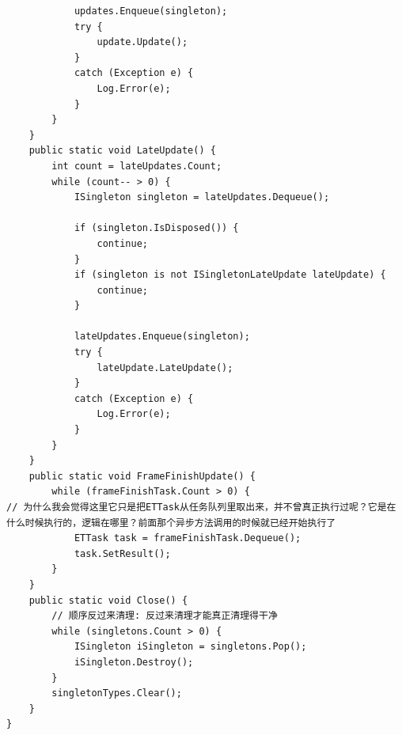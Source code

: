 \documentclass[9pt, b5paper]{article}
\begin{document}
\begin{verbatim}
            updates.Enqueue(singleton);
            try {
                update.Update();
            }
            catch (Exception e) {
                Log.Error(e);
            }
        }
    }
    public static void LateUpdate() {
        int count = lateUpdates.Count;
        while (count-- > 0) {
            ISingleton singleton = lateUpdates.Dequeue();

            if (singleton.IsDisposed()) {
                continue;
            }
            if (singleton is not ISingletonLateUpdate lateUpdate) {
                continue;
            }

            lateUpdates.Enqueue(singleton);
            try {
                lateUpdate.LateUpdate();
            }
            catch (Exception e) {
                Log.Error(e);
            }
        }
    }
    public static void FrameFinishUpdate() {
        while (frameFinishTask.Count > 0) {
// 为什么我会觉得这里它只是把ETTask从任务队列里取出来，并不曾真正执行过呢？它是在什么时候执行的，逻辑在哪里？前面那个异步方法调用的时候就已经开始执行了
            ETTask task = frameFinishTask.Dequeue(); 
            task.SetResult();
        }
    }
    public static void Close() {
        // 顺序反过来清理: 反过来清理才能真正清理得干净
        while (singletons.Count > 0) {
            ISingleton iSingleton = singletons.Pop();
            iSingleton.Destroy();
        }
        singletonTypes.Clear();
    }
}
\end{verbatim}
\end{document}
